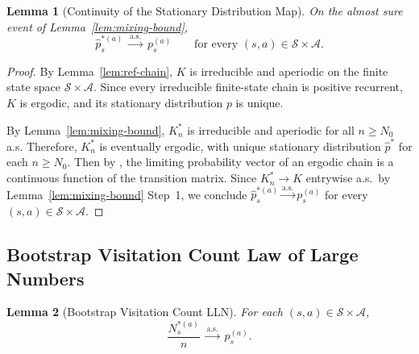 \documentclass{article}
\numberwithin{equation}{section}
\newtheorem{lemma}{Lemma}
\begin{document}
\begin{lemma}[Continuity of the Stationary Distribution Map]
\label{lem:statdist}
On the almost sure event of Lemma~\ref{lem:mixing-bound},
\[
\hat p_s^{\ast(a)} \;\xrightarrow{\mathrm{a.s.}}\; p_s^{(a)}
\qquad\text{for every }(s,a)\in\mathcal{S}\times\mathcal{A}.
\]
\end{lemma}

\begin{proof}
By Lemma~\ref{lem:ref-chain}, $K$ is irreducible and aperiodic on the finite state space $\mathcal{S}\times\mathcal{A}$. Since every irreducible finite-state chain is positive recurrent, $K$ is ergodic, and its stationary distribution $p$ is unique. 

By Lemma~\ref{lem:mixing-bound}, $K_n^\ast$ is irreducible and aperiodic for all $n\ge N_0$ a.s. Therefore, $K_n^\ast$ is eventually ergodic, with unique stationary distribution $\hat p^\ast$ for each $n\ge N_0$. Then by \citet[Theorem~4.1]{meyer1980condition}, the limiting probability vector of an ergodic chain is a continuous function of the transition matrix. Since $K_n^\ast\to K$ entrywise a.s.\ by Lemma~\ref{lem:mixing-bound} Step~1, we conclude $\hat p_s^{\ast(a)}\xrightarrow{\mathrm{a.s.}} p_s^{(a)}$ for every $(s,a)\in\mathcal{S}\times\mathcal{A}$.
\end{proof}

\subsection{Bootstrap Visitation Count Law of Large Numbers}
\label{app:lem:bootstrap-lln}

\begin{lemma}[Bootstrap Visitation Count LLN]
\label{lem:bootstrap-lln}
For each $(s,a)\in\mathcal{S}\times\mathcal{A}$,
\[
\frac{N_s^{\ast(a)}}{n} \;\xrightarrow{\mathrm{a.s.}}\; p_s^{(a)}.
\]
\end{lemma}
\end{document}
